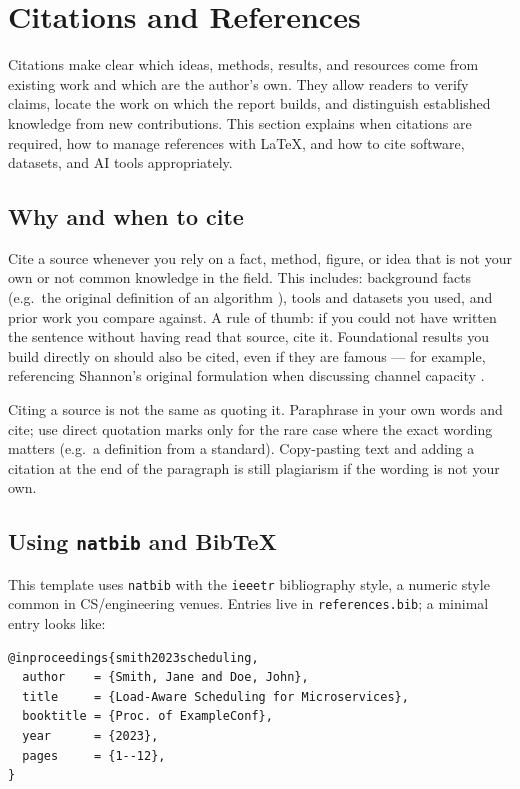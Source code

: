 \section{Citations and References}
\label{sec:citations}
Citations make clear which ideas, methods, results, and resources come
from existing work and which are the author's own. They allow readers to
verify claims, locate the work on which the report builds, and distinguish
established knowledge from new contributions. This section explains when
citations are required, how to manage references with \LaTeX{}, and how to
cite software, datasets, and AI tools appropriately.

\subsection{Why and when to cite}
Cite a source whenever you rely on a fact, method, figure, or idea that
is not your own or not common knowledge in the field. This includes:
background facts (e.g.\ the original definition of an algorithm
\cite{dijkstra1959}), tools and datasets you used, and prior work you
compare against. A rule of thumb: if you could not have written the
sentence without having read that source, cite it. Foundational results
you build directly on should also be cited, even if they are famous ---
for example, referencing Shannon's original formulation when discussing
channel capacity \cite{shannon1948}.

\begin{pitfallbox}
  Citing a source is not the same as quoting it. Paraphrase in your own
  words and cite; use direct quotation marks only for the rare case where
  the exact wording matters (e.g.\ a definition from a standard).
  Copy-pasting text and adding a citation at the end of the paragraph is
  still plagiarism if the wording is not your own.
\end{pitfallbox}

\subsection{Using \texttt{natbib} and BibTeX}
This template uses \texttt{natbib} with the \texttt{ieeetr} bibliography
style, a numeric style common in CS/engineering venues. Entries live in
\texttt{references.bib}; a minimal entry looks like:

\begin{lstlisting}[language=TeX, caption={A BibTeX entry.}]
@inproceedings{smith2023scheduling,
  author    = {Smith, Jane and Doe, John},
  title     = {Load-Aware Scheduling for Microservices},
  booktitle = {Proc. of ExampleConf},
  year      = {2023},
  pages     = {1--12},
}
\end{lstlisting}

